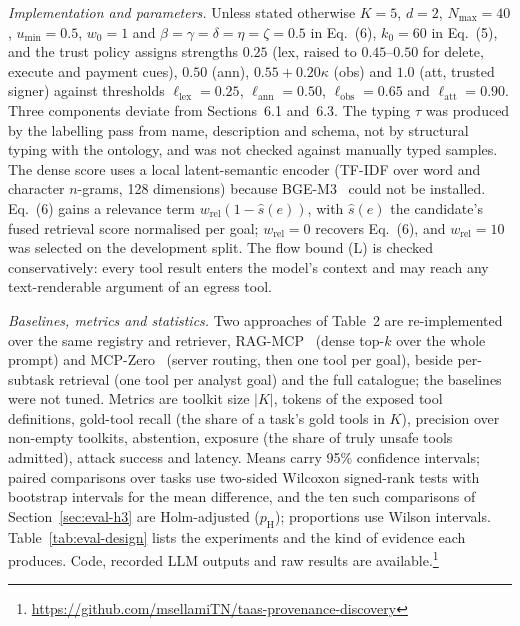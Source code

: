 \emph{Implementation and parameters.} Unless stated otherwise $K=5$, $d=2$,
$N_{\max}=40$, $u_{\min}=0.5$, $w_0=1$ and $\beta=\gamma=\delta=\eta=\zeta=0.5$ in Eq.~(6), $k_0=60$ in
Eq.~(5), and the trust policy assigns strengths $0.25$ (lex, raised to $0.45$--$0.50$ for delete, execute and
payment cues), $0.50$ (ann), $0.55+0.20\kappa$ (obs) and $1.0$ (att, trusted signer) against thresholds
$\ell_{\mathrm{lex}}=0.25$, $\ell_{\mathrm{ann}}=0.50$, $\ell_{\mathrm{obs}}=0.65$ and
$\ell_{\mathrm{att}}=0.90$. Three components deviate from Sections~6.1 and~6.3. The typing $\tau$ was
produced by the labelling pass from name, description and schema, not by structural typing with the
ontology, and was not checked against manually typed samples. The dense score uses a local latent-semantic
encoder (TF-IDF over word and character $n$-grams, 128 dimensions) because BGE-M3~\cite{chen2024bgem3} could
not be installed. Eq.~(6) gains a relevance term $w_{\mathrm{rel}}(1-\hat{s}(e))$, with $\hat{s}(e)$ the
candidate's fused retrieval score normalised per goal; $w_{\mathrm{rel}}=0$ recovers Eq.~(6), and
$w_{\mathrm{rel}}=10$ was selected on the development split. The flow bound (L) is checked conservatively:
every tool result enters the model's context and may reach any text-renderable argument of an egress tool.

\emph{Baselines, metrics and statistics.} Two approaches of Table~2 are re-implemented over the same registry
and retriever, RAG-MCP~\cite{gan2025ragmcp} (dense top-$k$ over the whole prompt) and
MCP-Zero~\cite{fei2025mcpzero} (server routing, then one tool per goal), beside per-subtask retrieval (one
tool per analyst goal) and the full catalogue; the baselines were not tuned. Metrics are toolkit size $|K|$,
tokens of the exposed tool definitions, gold-tool recall (the share of a task's gold tools in $K$), precision
over non-empty toolkits, abstention, exposure (the share of truly unsafe tools admitted), attack success and
latency. Means carry 95\% confidence intervals; paired comparisons over tasks use two-sided Wilcoxon
signed-rank tests with bootstrap intervals for the mean difference, and the ten such comparisons of
Section~\ref{sec:eval-h3} are Holm-adjusted ($p_{\mathrm{H}}$); proportions use Wilson intervals.
Table~\ref{tab:eval-design} lists the experiments and the kind of evidence each produces. Code, recorded LLM
outputs and raw results are available.\footnote{\url{https://github.com/msellamiTN/taas-provenance-discovery}}

